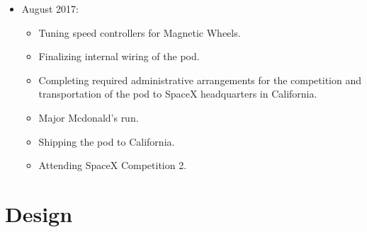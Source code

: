 \documentclass[11pt,a4paper,oldfontcommands]{memoir}
\begin{document}
\begin{itemize}
																																																																		           \item August 2017:
																																																																			       \begin{itemize}
																																																																			               \item Tuning speed controllers for Magnetic Wheels.
																																																																				               \item Finalizing internal wiring of the pod.
																																																																					               \item Completing required administrative arrangements for the competition and transportation of the pod to SpaceX headquarters in California.
																																																																						               \item Major Mcdonald's run.
																																																																							               \item Shipping the pod to California.
																																																																								               \item Attending SpaceX Competition 2.
																																																																									           \end{itemize}

																																																																										       \end{itemize}

																																																																										       \chapter{Design}
\end{document}
